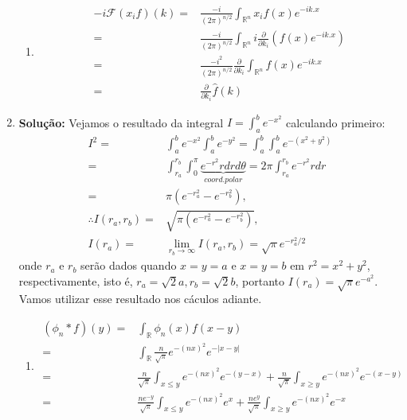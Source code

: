 \documentclass{article}
\begin{document}
\begin{enumerate}
\begin{enumerate}
				\item
				$$
				\begin{aligned}
				-i\mathcal{F}(x_{i}f)(k) = & \frac{-i}{(2\pi)^{n/2}}\int_{\mathbb{R}^{n}} x_{i}f(x)e^{-ik.x}
				\\
				= & \frac{-i}{(2\pi)^{n/2}}\int_{\mathbb{R}^{n}} i\frac{\partial}{\partial k_{i}}( f(x)e^{-ik.x} )
				\\
				= & \frac{-i^{2}}{(2\pi)^{n/2}} \frac{\partial}{\partial k_{i}}\int_{\mathbb{R}^{n}} f(x)e^{-ik.x}
				\\
				= & \frac{\partial}{\partial k_{i}}\hat{f}(k)
				\end{aligned}
				$$
			\end{enumerate}
		
		\item \textbf{Solução:} Vejamos o resultado da integral $I = \int_{a}^{b} e^{-x^{2}}$ calculando primeiro:
		$$
		\begin{aligned}
		I^{2} = & \int_{a}^{b} e^{-x^{2}}\int_{a}^{b} e^{-y^{2}} = \int_{a}^{b} \int_{a}^{b} e^{-(x^{2}+y^{2})} 
		\\
		= & \int_{r_{a}}^{r_{b}} \int_{0}^{\pi} \underbrace{ e^{-r^{2}}r dr d\theta }_{coord. polar} = 2\pi \int_{r_{a}}^{r_{b}} e^{-r^{2}}r dr
		\\
		= & \pi (e^{-r_{a}^{2}} - e^{-r_{b}^{2}}),
		\\
		\therefore I(r_{a}, r_{b}) = & \sqrt{\pi (e^{-r_{a}^{2}} - e^{-r_{b}^{2}})},
		\\
		I(r_{a}) = & \lim_{r_{b} \to \infty} I(r_{a}, r_{b}) = \sqrt{\pi} e^{-r_{a}^{2}/2}
		\end{aligned}
		$$
		onde $r_{a}$ e $r_{b}$ serão dados quando $x=y=a$ e $x=y=b$ em  $r^{2} = x^{2}+y^{2}$, respectivamente, isto é, $r_{a} = \sqrt{2}a, r_{b} = \sqrt{2}b$, portanto $I(r_{a}) = \sqrt{\pi}e^{-a^{2}}$. Vamos utilizar esse resultado nos cáculos adiante.
			\begin{enumerate}
				\item
					$$
					\begin{aligned}
					(\phi_{n}*f)(y) = &\int_{\mathbb{R}} \phi_{n}(x)f(x-y)
					\\
					= &\int_{\mathbb{R}} \frac{n}{\sqrt{\pi}}e^{-(nx)^{2}} e^{-|x-y|}
					\\
					= & \frac{n}{\sqrt{\pi}}\int_{x \leq y} e^{-(nx)^{2}} e^{-(y-x)} + \frac{n}{\sqrt{\pi}}\int_{x \geq y} e^{-(nx)^{2}} e^{-(x-y)}
					\\
					= & \frac{ne^{-y}}{\sqrt{\pi}}\int_{x \leq y} e^{-(nx)^{2}} e^{x} + \frac{ne^{y}}{\sqrt{\pi}}\int_{x \geq y} e^{-(nx)^{2}} e^{-x}

\end{aligned}$$
\end{enumerate}
\end{enumerate}
\end{document}

